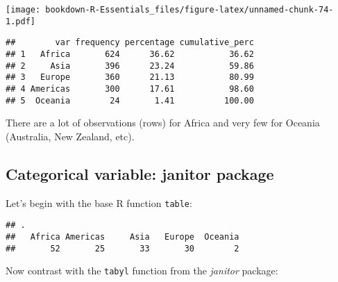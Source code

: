 \documentclass[
]{book}
\newenvironment{Shaded}{\begin{snugshade}}{\end{snugshade}}
\newcommand{\DataTypeTok}[1]{\textcolor[rgb]{0.13,0.29,0.53}{#1}}
\newcommand{\DecValTok}[1]{\textcolor[rgb]{0.00,0.00,0.81}{#1}}
\newcommand{\KeywordTok}[1]{\textcolor[rgb]{0.13,0.29,0.53}{\textbf{#1}}}
\newcommand{\NormalTok}[1]{#1}
\newcommand{\OperatorTok}[1]{\textcolor[rgb]{0.81,0.36,0.00}{\textbf{#1}}}
\newcommand{\OtherTok}[1]{\textcolor[rgb]{0.56,0.35,0.01}{#1}}
\newcommand{\StringTok}[1]{\textcolor[rgb]{0.31,0.60,0.02}{#1}}
\begin{document}
\texttt{[image: bookdown-R-Essentials\_files/figure-latex/unnamed-chunk-74-1.pdf]}

\begin{verbatim}
##        var frequency percentage cumulative_perc
## 1   Africa       624      36.62           36.62
## 2     Asia       396      23.24           59.86
## 3   Europe       360      21.13           80.99
## 4 Americas       300      17.61           98.60
## 5  Oceania        24       1.41          100.00
\end{verbatim}

There are a lot of observations (rows) for Africa and very few for Oceania (Australia, New Zealand, etc).

\hypertarget{categorical-variable-janitor-package}{%
\subsection{Categorical variable: janitor package}\label{categorical-variable-janitor-package}}

Let's begin with the base R function \texttt{table}:

\begin{Shaded}
\end{Shaded}

\begin{verbatim}
## .
##   Africa Americas     Asia   Europe  Oceania 
##       52       25       33       30        2
\end{verbatim}

Now contrast with the \texttt{tabyl} function from the \emph{janitor} package:

\begin{Shaded}
\end{Shaded}
\end{document}
